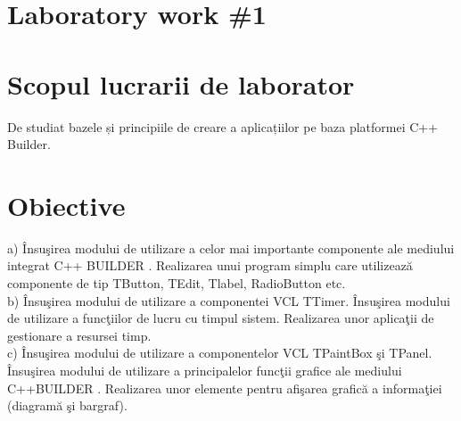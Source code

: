 \section*{Laboratory work \#1}

\section{Scopul lucrarii de laborator}
De studiat bazele și principiile de creare a aplicațiilor pe baza platformei C++ Builder.\\

\section{Obiective}

a) Însuşirea modului de utilizare a celor mai importante componente ale mediului integrat C++
BUILDER .
Realizarea unui program simplu care utilizează componente de tip TButton, TEdit, Tlabel,
RadioButton etc.\\
b) Însuşirea modului de utilizare a componentei VCL TTimer. Însuşirea modului de utilizare a
funcţiilor de lucru cu timpul sistem. Realizarea unor aplicaţii de gestionare a resursei timp.\\
c) Însuşirea modului de utilizare a componentelor VCL TPaintBox şi TPanel. Însuşirea modului
de utilizare a principalelor funcţii grafice ale mediului C++BUILDER . Realizarea unor elemente
pentru afişarea grafică a informaţiei (diagramă şi bargraf).

\clearpage